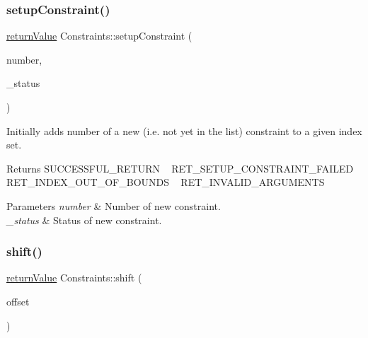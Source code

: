 \subsubsection{\texorpdfstring{setup\+Constraint()}{setupConstraint()}}
{\footnotesize\ttfamily \hyperlink{_message_handling_8hpp_a81d556f613bfbabd0b1f9488c0fa865e}{return\+Value} Constraints\+::setup\+Constraint (\begin{DoxyParamCaption}\item[{\hyperlink{_types_8hpp_ab6fd6105e64ed14a0c9281326f05e623}{int\+\_\+t}}]{number,  }\item[{\hyperlink{_types_8hpp_a70a6a40d261a015ead8d43aa589383a4}{Subject\+To\+Status}}]{\+\_\+status }\end{DoxyParamCaption})}

Initially adds number of a new (i.\+e. not yet in the list) constraint to a given index set. \begin{DoxyReturn}{Returns}
S\+U\+C\+C\+E\+S\+S\+F\+U\+L\+\_\+\+R\+E\+T\+U\+RN ~\newline
 R\+E\+T\+\_\+\+S\+E\+T\+U\+P\+\_\+\+C\+O\+N\+S\+T\+R\+A\+I\+N\+T\+\_\+\+F\+A\+I\+L\+ED ~\newline
 R\+E\+T\+\_\+\+I\+N\+D\+E\+X\+\_\+\+O\+U\+T\+\_\+\+O\+F\+\_\+\+B\+O\+U\+N\+DS ~\newline
 R\+E\+T\+\_\+\+I\+N\+V\+A\+L\+I\+D\+\_\+\+A\+R\+G\+U\+M\+E\+N\+TS 
\end{DoxyReturn}

\begin{DoxyParams}{Parameters}
{\em number} & Number of new constraint. \\
\hline
{\em \+\_\+status} & Status of new constraint. \\
\hline
\end{DoxyParams}
\mbox{\label{class_constraints_a7605104071cb0396a8c426bfce82c49f}} 
\subsubsection{\texorpdfstring{shift()}{shift()}}
{\footnotesize\ttfamily \hyperlink{_message_handling_8hpp_a81d556f613bfbabd0b1f9488c0fa865e}{return\+Value} Constraints\+::shift (\begin{DoxyParamCaption}\item[{\hyperlink{_types_8hpp_ab6fd6105e64ed14a0c9281326f05e623}{int\+\_\+t}}]{offset }\end{DoxyParamCaption})\hspace{0.3cm}{\ttfamily [virtual]}}

